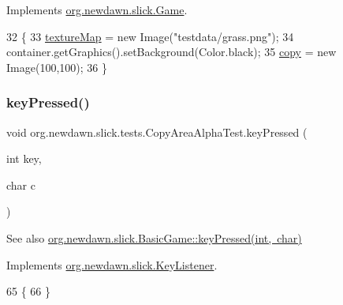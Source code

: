 Implements \mbox{\hyperlink{interfaceorg_1_1newdawn_1_1slick_1_1_game_ad2dd6affab08bb8fdb5fab0815957b7a}{org.\+newdawn.\+slick.\+Game}}.


\begin{DoxyCode}
32                                                                     \{
33         \mbox{\hyperlink{classorg_1_1newdawn_1_1slick_1_1tests_1_1_copy_area_alpha_test_a3ac052d3b96d0a06b587b856f390f0bd}{textureMap}} = \textcolor{keyword}{new} Image(\textcolor{stringliteral}{"testdata/grass.png"});
34         container.getGraphics().setBackground(Color.black);
35         \mbox{\hyperlink{classorg_1_1newdawn_1_1slick_1_1tests_1_1_copy_area_alpha_test_a65e4d5c340fc8e416483cfb8e9cce6be}{copy}} = \textcolor{keyword}{new} Image(100,100);
36     \}
\end{DoxyCode}
\mbox{\label{classorg_1_1newdawn_1_1slick_1_1tests_1_1_copy_area_alpha_test_ad3e659c4fc1026d613ffa7515ca21049}} 
\subsubsection{\texorpdfstring{key\+Pressed()}{keyPressed()}}
{\footnotesize\ttfamily void org.\+newdawn.\+slick.\+tests.\+Copy\+Area\+Alpha\+Test.\+key\+Pressed (\begin{DoxyParamCaption}\item[{int}]{key,  }\item[{char}]{c }\end{DoxyParamCaption})\hspace{0.3cm}{\ttfamily [inline]}}

\begin{DoxySeeAlso}{See also}
\mbox{\hyperlink{classorg_1_1newdawn_1_1slick_1_1_basic_game_a4fbb3345b5abf5ddd54a99466d07f02f}{org.\+newdawn.\+slick.\+Basic\+Game\+::key\+Pressed(int, char)}} 
\end{DoxySeeAlso}


Implements \mbox{\hyperlink{interfaceorg_1_1newdawn_1_1slick_1_1_key_listener_ac0b0568a21ef486c4f51382614c196ef}{org.\+newdawn.\+slick.\+Key\+Listener}}.


\begin{DoxyCode}
65                                             \{
66     \}
\end{DoxyCode}
\mbox{\label{classorg_1_1newdawn_1_1slick_1_1tests_1_1_copy_area_alpha_test_a8951242f70d532c48647bbcfeac17594}} 
